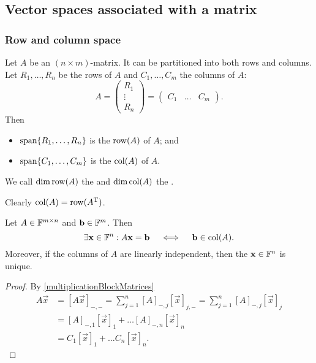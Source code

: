 \subsection{Vector spaces associated with a matrix}
\subsubsection{Row and column space}
\begin{definition}
Let $A$ be an $(n\times m)$-matrix. It can be partitioned into both rows and columns. Let $R_1,\ldots, R_n$ be the rows of $A$ and $C_1,\ldots, C_m$ the columns of $A$:
\[ A = \begin{pmatrix}
R_1 \\ \vdots \\ R_n
\end{pmatrix} = \begin{pmatrix}
C_1 & \hdots & C_m
\end{pmatrix}. \]
Then
\begin{itemize}
\item $\operatorname{span}\{R_1,\ldots, R_n\}$ is the  $\operatorname{row}(A)$ of $A$; and
\item $\operatorname{span}\{C_1,\ldots, C_m\}$ is the  $\operatorname{col}(A)$ of $A$.
\end{itemize}
We call $\dim\operatorname{row}(A)$ the  and $\dim\operatorname{col}(A)$ the .
\end{definition}
Clearly $\operatorname{col}(A) = \operatorname{row}(A^{\mathrm{T}})$.

\begin{lemma} \label{columnSpace}
Let $A\in \mathbb{F}^{m\times n}$ and $\boldsymbol{\mathrm{b}}\in \mathbb{F}^m$. Then
\[ \exists \boldsymbol{\mathrm{x}}\in\mathbb{F}^n: A\boldsymbol{\mathrm{x}}=\boldsymbol{\mathrm{b}} \quad\iff\quad \boldsymbol{\mathrm{b}}\in\operatorname{col}(A). \]
Moreover, if the columns of $A$ are linearly independent, then the $\boldsymbol{\mathrm{x}}\in\mathbb{F}^n$ is unique. 
\end{lemma}
\begin{proof}
By \ref{multiplicationBlockMatrices}
\begin{align*}
A\vec{x} &= [A\vec{x}]_{-,-} = \sum_{j=1}^n[A]_{-,j}[\vec{x}]_{j,-} = \sum_{j=1}^n[A]_{-,j}[\vec{x}]_{j} \\
&= [A]_{-,1}[\vec{x}]_1 + \ldots [A]_{-,n}[\vec{x}]_n  \\
&= C_1[\vec{x}]_1 + \ldots C_n[\vec{x}]_n.
\end{align*}
\end{proof}

